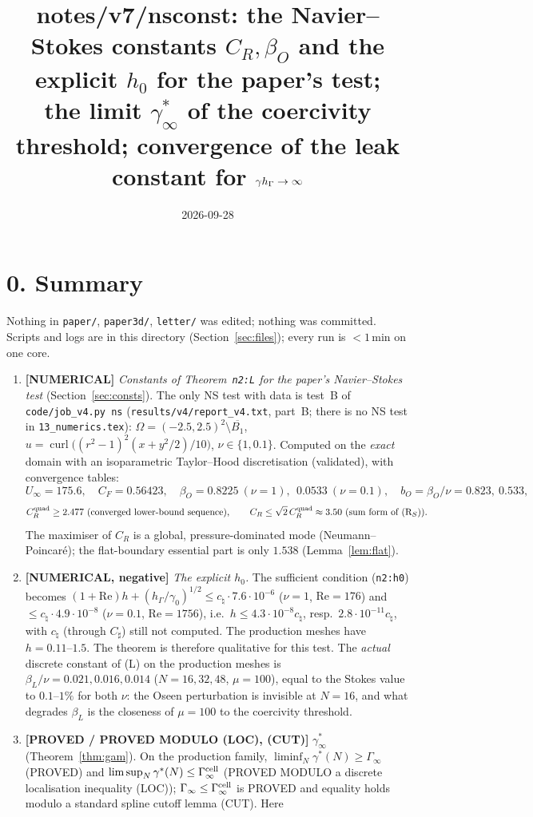 \documentclass[11pt]{article}
\title{notes/v7/nsconst: the Navier--Stokes constants $C_R,\beta_O$ and the explicit $h_0$ for the paper's test;\\
the limit $\gamma^\ast_\infty$ of the coercivity threshold; convergence of the leak constant for $\gamma\hG\to\infty$}
\date{2026-09-28}
\theoremstyle{definition}
\theoremstyle{remark}
\newcommand{\hG}{h_\Gamma}
\renewcommand{\Re}{\mathrm{Re}}
\newcommand{\lab}[1]{\textbf{[#1]}}
\begin{document}
\maketitle

\section*{0. Summary}
Nothing in \texttt{paper/}, \texttt{paper3d/}, \texttt{letter/} was edited; nothing was committed. Scripts and logs are in this directory (Section~\ref{sec:files}); every run is $<1$\,min on one core.

\begin{enumerate}[label=(\alph*)]
\item \lab{NUMERICAL} \emph{Constants of Theorem~\texttt{n2:L} for the paper's Navier--Stokes test} (Section~\ref{sec:consts}). The only NS test with data is test~B of \texttt{code/job\_v4.py ns} (\texttt{results/v4/report\_v4.txt}, part~B; there is no NS test in \texttt{13\_numerics.tex}): $\Omega=(-2.5,2.5)^2\setminus\overline{B_1}$, $u=\operatorname{curl}\bigl((r^2-1)^2(x+y^2/2)/10\bigr)$, $\nu\in\{1,0.1\}$. Computed on the \emph{exact} domain with an isoparametric Taylor--Hood discretisation (validated), with convergence tables:
\[
U_\infty=175.6,\quad C_F=0.56423,\quad \beta_O=0.8225\ (\nu=1),\ \ 0.0533\ (\nu=0.1),\quad b_O=\beta_O/\nu=0.823,\ 0.533,
\]
\[
C_R^{\rm quad}\ge2.477\ (\text{converged lower-bound sequence}),\qquad C_R\le\sqrt2\,C_R^{\rm quad}\approx3.50\ \text{(sum form of (R$_S$))}.
\]
The maximiser of $C_R$ is a global, pressure-dominated mode (Neumann--Poincar\'e); the flat-boundary essential part is only $1.538$ (Lemma~\ref{lem:flat}).
\item \lab{NUMERICAL, negative} \emph{The explicit $h_0$.} The sufficient condition (\texttt{n2:h0}) becomes
$(1+\Re)h+(\hG/\gamma_0)^{1/2}\le c_\natural\cdot7.6\cdot10^{-6}$ ($\nu=1$, $\Re=176$) and $\le c_\natural\cdot4.9\cdot10^{-8}$ ($\nu=0.1$, $\Re=1756$),
i.e.\ $h\le4.3\cdot10^{-8}c_\natural$, resp.\ $2.8\cdot10^{-11}c_\natural$, with $c_\natural$ (through $C_\sharp$) still not computed.
The production meshes have $h=0.11$--$1.5$. The theorem is therefore qualitative for this test. The \emph{actual} discrete constant of (L) on the production meshes is $\beta_L/\nu=0.021,0.016,0.014$ ($N=16,32,48$, $\mu=100$), equal to the Stokes value to $0.1$--$1\%$ for both $\nu$: the Oseen perturbation is invisible at $N=16$, and what degrades $\beta_L$ is the closeness of $\mu=100$ to the coercivity threshold.
\item \lab{PROVED / PROVED MODULO (LOC), (CUT)} \emph{$\gamma^\ast_\infty$} (Theorem~\ref{thm:gam}). On the production family, $\liminf_N\gamma^\ast(N)\ge\Gamma_\infty$ (PROVED) and $\limsup_N\gamma^\ast(N)\le\Gamma^{\rm cell}_\infty$ (PROVED MODULO a discrete localisation inequality (LOC)); $\Gamma_\infty\le\Gamma^{\rm cell}_\infty$ is PROVED and equality holds modulo a standard spline cutoff lemma (CUT). Here

\end{enumerate}
\end{document}
